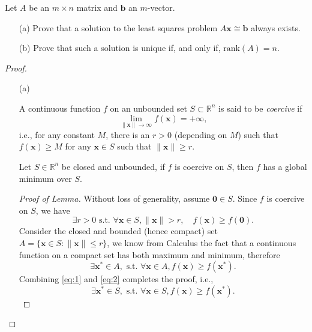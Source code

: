 \begin{pro}
  Let $A$ be an $m\times n$ matrix and $\mathbf{b}$ an $m$-vector.
  \begin{itemize}
  \item[(a)]
    Prove that a solution to the least squares problem $A\mathbf{x}\cong\mathbf{b}$
    always exists.

  \item[(b)]
    Prove that such a solution is unique if, and only if,
    $\mathrm{rank}(A)=n$.
  \end{itemize}
\end{pro}

\begin{proof}
  \begin{itemize}

    \item[(a)]
  \begin{defn}
    A continuous function $f$ on an unbounded set $S\subset\mathbb{R}^n$
    is said to be \emph{coercive} if
    \begin{displaymath}
      \lim_{\|\mathbf{x}\|\to\infty}f(\mathbf{x}) = +\infty,
    \end{displaymath}
    i.e., for any constant $M$,
    there is an $r>0$ (depending on $M$) such that $f(\mathbf{x})\ge M$
    for any $\mathbf{x}\in S$ such that $\|\mathbf{x}\|\ge r$.
  \end{defn}

  \begin{lem}
    Let $S\in\mathbb{R}^n$ be closed and unbounded,
    if $f$ is coercive on $S$, then
    $f$ has a global minimum over $S$.
  \end{lem}
  \begin{proof}[Proof of Lemma]
    Without loss of generality,
    assume $\mathbf{0}\in S$.
    Since $f$ is coercive on $S$,
    we have
    \begin{equation}
      \label{eq:1}
      \exists r>0 \text{ s.t. } \forall \mathbf{x}\in S, \|\mathbf{x}\|> r, \quad
      f(\mathbf{x}) \ge f(\mathbf{0}).
    \end{equation}
    Consider the closed and bounded (hence compact) set
    $A = \{\mathbf{x}\in S: \|\mathbf{x}\|\le r\}$,
    we know from Calculus the fact that a continuous function on a compact
    set has both maximum and minimum,
    therefore
    \begin{equation}
      \label{eq:2}
      \exists \mathbf{x}^{*}\in A, \text{ s.t. }
      \forall \mathbf{x}\in A, f(\mathbf{x})\ge f(\mathbf{x}^{*}).
    \end{equation}
    Combining \eqref{eq:1} and \eqref{eq:2} completes the proof, i.e.,
    \begin{displaymath}
      \exists \mathbf{x}^{*}\in S, \text{ s.t. } \forall \mathbf{x}\in S,
      f(\mathbf{x})\ge f(\mathbf{x}^{*}).
    \end{displaymath}
  \end{proof}


\end{itemize}
\end{proof}
